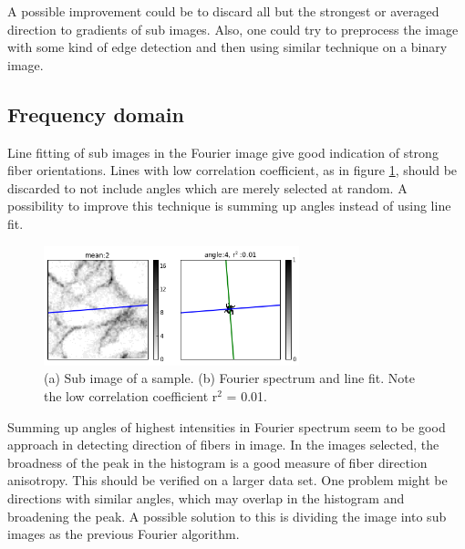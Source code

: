 A possible improvement could be to discard all but the strongest or averaged direction to gradients of sub images. Also, one could try to preprocess the image with some kind of edge detection and then using similar technique on a binary image.


\subsection{Frequency domain}
Line fitting of sub images in the Fourier image give good indication of strong fiber orientations. Lines with low correlation coefficient, as in figure \ref{fig:line_bad}, should be discarded to not include angles which are merely selected at random. A possibility to improve this technique is summing up angles instead of using line fit.

\begin{figure}[h]
\centering
\includegraphics[width=0.66\textwidth]{ft_line_bad}
\caption{(a) Sub image of a sample. (b) Fourier spectrum and line fit. Note the low correlation coefficient r$^2$ = 0.01.}
\label{fig:line_bad}
\end{figure}

Summing up angles of highest intensities in Fourier spectrum seem to be good approach in detecting direction of fibers in image. In the images selected, the broadness of the peak in the histogram is a good measure of fiber direction anisotropy. This should be verified on a larger data set. One problem might be directions with similar angles, which may overlap in the histogram and broadening the peak. A possible solution to this is dividing the image into sub images as the previous Fourier algorithm.